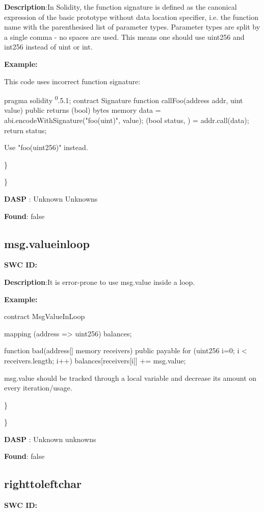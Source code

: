 \documentclass{article}
\begin{document}
\textbf{Description}:In Solidity, the function signature is defined as the canonical expression of the basic prototype without data location specifier, i.e. the function name with the parenthesised list of parameter types. Parameter types are split by a single comma - no spaces are used. This means one should use uint256 and int256 instead of uint or int.


\textbf{Example:} 

This code uses incorrect function signature:

pragma solidity \textsuperscript0.5.1;
contract Signature {
    function callFoo(address addr, uint value) public returns (bool) {
        bytes memory data = abi.encodeWithSignature("foo(uint)", value);
        (bool status, ) = addr.call(data);
        return status;
    }
}

Use "foo(uint256)" instead.

\} 

\} 

\textbf{DASP} : Unknown Unknowns

\textbf{Found}: false

\subsection{msg.value\textunderscore in\textunderscore loop} 
\textbf{SWC \textunderscore ID:} 

\textbf{Description}:It is error-prone to use msg.value inside a loop.


\textbf{Example:} 

contract MsgValueInLoop{
    mapping (address => uint256) balances;

    function bad(address[] memory receivers) public payable {
        for (uint256 i=0; i < receivers.length; i++) {
            balances[receivers[i]] += msg.value;
        }
    }
}

msg.value should be tracked through a local variable and decrease its amount on every iteration/usage.

\} 

\} 

\textbf{DASP} : Unknown unknowns

\textbf{Found}: false

\subsection{right\textunderscore to\textunderscore left\textunderscore char} 
\textbf{SWC \textunderscore ID:} 
\end{document}
